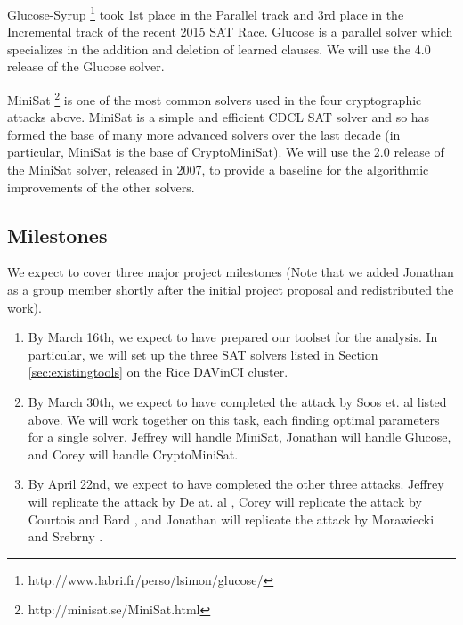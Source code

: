 Glucose-Syrup \footnote{http://www.labri.fr/perso/lsimon/glucose/} took 1st place in the Parallel track and 3rd place in the Incremental track of the recent 2015 SAT Race. Glucose is a parallel solver which specializes in the addition and deletion of learned clauses. We will use the 4.0 release of the Glucose solver.

MiniSat \footnote{http://minisat.se/MiniSat.html} is one of the most common solvers used in the four cryptographic attacks above. MiniSat is a simple and efficient CDCL SAT solver and so has formed the base of many more advanced solvers over the last decade (in particular, MiniSat is the base of CryptoMiniSat). We will use the 2.0 release of the MiniSat solver, released in 2007, to provide a baseline for the algorithmic improvements of the other solvers.

\subsection{Milestones}
We expect to cover three major project milestones (Note that we added Jonathan as a group member shortly after the initial project proposal and redistributed the work).
\begin{enumerate}
	\item By March 16th, we expect to have prepared our toolset for the analysis. In particular, we will set up the three SAT solvers listed in Section \ref{sec:existingtools} on the Rice DAVinCI cluster.
	
	\item By March 30th, we expect to have completed the attack by Soos et. al \cite{SNC09} listed above. We will work together on this task, each finding optimal parameters for a single solver. Jeffrey will handle MiniSat, Jonathan will handle Glucose, and Corey will handle CryptoMiniSat.
	
	\item By April 22nd, we expect to have completed the other three attacks. Jeffrey will replicate the attack by De at. al \cite{DKV07}, Corey will replicate the attack by Courtois and Bard \cite{CB07}, and Jonathan will replicate the attack by Morawiecki and Srebrny \cite{MS13}.
\end{enumerate}